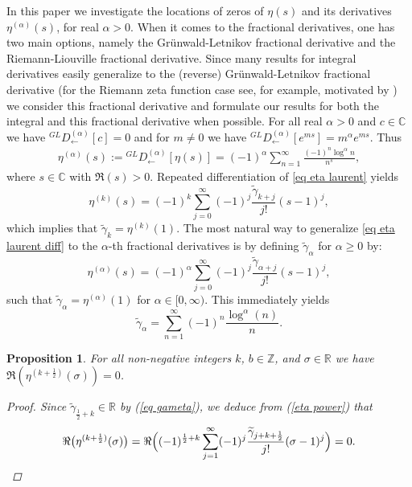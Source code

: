 \documentclass{amsart}
\theoremstyle{plain}
\newtheorem{proposition}[theorem]{Proposition}
\theoremstyle{definition}
\newcommand{\etalpha}{\eta^{(\alpha)}}
\newcommand{\gameta}[1]{\widetilde\gamma_{#1}}
\newcommand{\diffint}[5]{{}^{#2}_{#5}\!#1^{(#4)}_{#3}}
\newcommand{\GL}[2]{\diffint{D}{GL}{#1}{#2}{}}    %
\newcommand{\R}{\mathbb{R}} \newcommand{\Z}{\mathbb{Z}}
\newcommand{\C}{\mathbb{C}} \newcommand{\N}{\mathbb{N}}
\newcommand{\fixme}[1]{{\color{purple}FIXME: #1}}
\begin{document}
In this paper we investigate the locations of zeros of $\eta(s)$ and its derivatives $\eta^{(\alpha)}(s)$, 
for real  $\alpha> 0$.   When it comes to the fractional derivatives, one has two main options, namely the Gr\"unwald-Letnikov fractional derivative \cite{g:1867,l:1869-1,l:1869-2}
and the Riemann-Liouville fractional derivative.  Since many results for integral derivatives easily generalize to the (reverse) Gr\"unwald-Letnikov fractional derivative (for the Riemann zeta function case see, for example, \cite{fps} motivated by \cite{kreminski03}) we consider this fractional derivative and formulate our results for both the integral and this fractional derivative when possible.
For all real $\alpha > 0$ and $c\in\C$ we have $\GL{\leftarrow}{\alpha}[c] = 0$ and for $m\ne 0$ we have $\GL{\leftarrow}{\alpha}\left[e^{ms}\right]  = m^\alpha e^{ms}$.  Thus
\begin{align*}%
    \etalpha(s) := \GL{\leftarrow}{\alpha}[\eta(s)] = 
    (-1)^\alpha\sum_{n=1}^{\infty}\frac{(-1)^{n}\log^{\alpha} n}{n^s}, 
\end{align*}
where $s\in\C$ with $\Re(s)>0$.  Repeated differentiation of \eqref{eq eta laurent} yields
\begin{equation}\label{eq eta laurent diff}
\eta^{(k)}(s)=(-1)^k\sum_{j=0}^\infty (-1)^{j}\frac{\gameta{k+j}}{j!}(s-1)^j,
\end{equation}
which implies that $\gameta{k}=\eta^{(k)}(1)$.
The most natural way to generalize \eqref{eq eta laurent diff} to the $\alpha$-th fractional derivatives is by defining \(\widetilde\gamma_\alpha\) for \(\alpha\ge 0\) by:  
\begin{equation}\label{eta power}
\eta^{(\alpha)}(s)=(-1)^{\alpha}\sum_{j=0}^\infty (-1)^{j}\frac{\gameta{\alpha+j}}{j!}(s-1)^j,
\end{equation}
such that \(\gameta{\alpha}=\eta^{(\alpha)}(1)\) for $\alpha\in[0,\infty)$. 
This immediately yields 
\begin{equation}\label{eq gameta}
\gameta{\alpha}=\sum_{n=1}^{\infty}(-1)^{n}\frac{\log^\alpha(n)}{n}.
\end{equation}
\begin{proposition}
For all non-negative integers \(k\),
\(b\in\Z\), and \(\sigma\in\R\) we have \(\Re\left(\eta^{(k+{\frac{1}{2}})}(\sigma)\right) =  0\).
\begin{proof}
    Since $\gameta{\frac{1}{2}+k} \in \R$ by (\ref{eq gameta}), we deduce from  (\ref{eta power}) that
    \[
        \Re\bigl(\eta^{(k+\frac{1}{2})}(\sigma)\bigr)=\Re\Bigl((-1)^{\frac{1}{2}+k}\sum_{j=1}^{\infty}(-1)^j\frac{\gameta{j+k+\frac{1}{2}}}{j!}(\sigma-1)^j\Bigr)=0. \qedhere
    \]
\end{proof}
\end{proposition}
\end{document}
